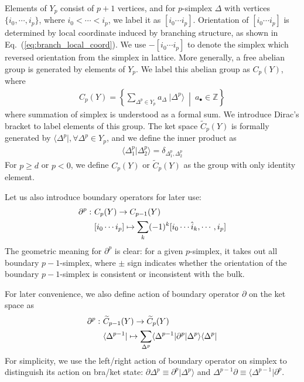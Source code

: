 \documentclass[%
  reprint,
  amsmath,amssymb,
  aps,pra,
]{revtex4-1}
\begin{document}
Elements of $Y_p$ consist of $p+1$ vertices, and for $p$-simplex $\Delta$ with vertices $\{i_0,\cdots,i_{p}\}$, where $i_0<\cdots<i_{p}$, we label it as $[i_0\cdots i_{p}]$.
Orientation of $[i_0\cdots i_{p}]$ is determined by local coordinate induced by branching structure, as shown in Eq.~(\ref{eq:branch_local_coord}).
We use $-[i_0 \cdots i_{p}]$ to denote the simplex which reversed orientation from the simplex in lattice.
More generally, a free abelian group is generated by elements of $Y_p$.
We label this abelian group as $C_p(Y)$, where
\begin{align}
  C_p(Y)=\left\{\sum_{\Delta^p\in Y_p}a_{\Delta}~|\Delta^p\rangle~\middle|~a_\bullet\in\mathbb{Z}\right\}
  \label{}
\end{align}
where summation of simplex is understood as a formal sum. 
We introduce Dirac's bracket to label elements of this group.
The ket space $\widetilde{C}_p(Y)$ is formally generated by $\langle\Delta^p|, \forall \Delta^p\in Y_p$, and we define the inner product as
\begin{align}
  \langle \Delta^p_1|\Delta^p_2\rangle=\delta_{\Delta^p_1,\Delta^p_2}
  \label{eq:simplex_inner_prod}
\end{align}
For $p\ge d$ or $p<0$, we define $C_p(Y)$ or $\widetilde{C}_p(Y)$ as the group with only identity element.

Let us also introduce boundary operators for later use:
\begin{align}
  \partial^{p}:~&C_p(Y)\rightarrow C_{p-1}(Y)\notag\\
  &[i_0 \cdots i_{p}]\mapsto\sum_{k}(-1)^k[i_0 \cdots \hat{i}_k,\cdots,i_{p}]
  \label{eq:simplicial_homology_bdry_operator}
\end{align}
The geometric meaning for $\partial^p$ is clear: for a given $p$-simplex, it takes out all boundary $p-1$-simplex, where $\pm$ sign indicates whether the orientation of the boundary $p-1$-simplex is consistent or inconsistent with the bulk.

For later convenience, we also define action of boundary operator $\partial$ on the ket space as
\begin{align}
  \partial^{p}:~&\widetilde{C}_{p-1}(Y)\rightarrow \widetilde{C}_{p}(Y)\notag\\
  &\langle\Delta^{p-1}|\mapsto\sum_{\Delta^p}\langle\Delta^{p-1}|\partial^p|\Delta^p\rangle\langle\Delta^p|
  \label{eq:ket_bdry_operator}
\end{align}
For simplicity, we use the left/right action of boundary operator on simplex to distinguish its action on bra/ket state: $\partial\Delta^p\equiv\partial^p|\Delta^p\rangle$ and $\Delta^{p-1}\partial\equiv\langle\Delta^{p-1}|\partial^p$.
\end{document}
